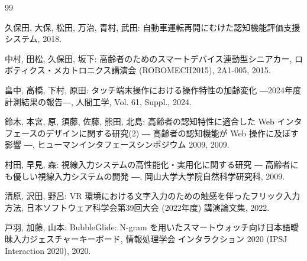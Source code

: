 \begin{thebibliography}{99}

\colorbox{tbd}{久保田, 大保, 松田, 万治, 青村, 武田}:  %
自動車運転再開にむけた認知機能評価支援システム, 2018.

\colorbox{tbd}{中村, 田松, 久保田, 坂下}:  %
高齢者のためのスマートデバイス連動型シニアカー,
ロボティクス・メカトロニクス講演会 (ROBOMECH2015), 2A1-005, 2015.

\colorbox{tbd}{畠中, 高橋, 下村, 原田}:  %
タッチ端末操作における操作特性の加齢変化 ―2024年度計測結果の報告―,
人間工学, Vol. 61, Suppl., 2024.

\colorbox{tbd}{鈴木, 本宮, 原, 須藤, 佐藤, 熊田, 北島}:  %
高齢者の認知特性に適合した Web インタフェースのデザインに関する研究(2) ― 高齢者の認知機能が Web 操作に及ぼす影響 ―,
ヒューマンインタフェースシンポジウム 2009, 2009.

\colorbox{tbd}{村田, 早見, 森}:  %
視線入力システムの高性能化・実用化に関する研究 ― 高齢者にも優しい視線入力システムの開発 ―,
岡山大学大学院自然科学研究科, 2009.

\colorbox{tbd}{清原, 沢田, 野呂}:  %
VR 環境における文字入力のための触感を伴ったフリック入力方法,
日本ソフトウェア科学会第39回大会 (2022年度) 講演論文集, 2022.

\colorbox{tbd}{戸羽, 加藤, 山本}:  %
BubbleGlide: N-gram を用いたスマートウォッチ向け日本語曖昧入力ジェスチャーキーボード,
情報処理学会 インタラクション 2020 (IPSJ Interaction 2020), 2020.


\end{thebibliography}
